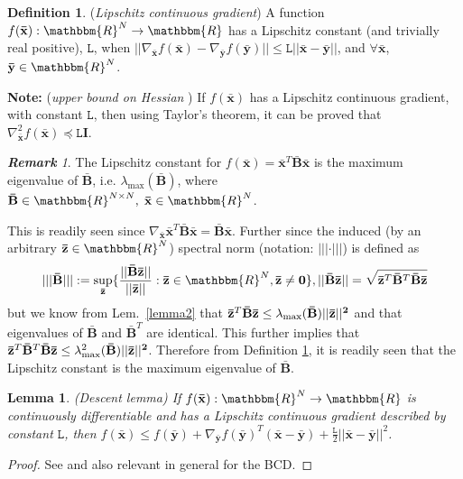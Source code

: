 \documentclass[11pt,draftclsnofoot,onecolumn]{IEEEtran}
\newtheorem{lem}{\bf {Lemma}}
\theoremstyle{definition}
\newtheorem{defn}{\bf Definition}
\theoremstyle{remark}
\newtheorem{remk}{\bf Remark}
\begin{document}
 \begin{defn}\label{mydef2}
({\it Lipschitz continuous gradient}) A function $f(\mathbf{\bar{x}}) :\mathbbm{R}^N\rightarrow\mathbbm{R}$ has a Lipschitz constant (and trivially real positive), $\mathtt{L}$, when $||\nabla_{\mathbf{\bar{x}}}f(\mathbf{\bar{x}})-\nabla_{\mathbf{\bar{y}}}f(\mathbf{\bar{y}})|| \leq\mathtt{L} || \mathbf{\bar{x}-\bar{y}}||$, and $\forall \mathbf{\bar{x}}$, $\mathbf{\bar{y}}\in \mathbbm{R}^N$.
\end{defn}
{\bf Note:} ({\it upper bound on Hessian} ) If $f(\mathbf{\bar{x}})$ has a Lipschitz continuous gradient, with constant $\mathtt{L}$, then  using Taylor's theorem, it can be proved that $\nabla_{\mathbf{\bar{x}}}^2 f(\mathbf{\bar{x}})\preceq \mathtt{L}\mathbf{I}$.
\begin{remk} \label{remark3}
The Lipschitz constant for $f(\mathbf{\bar{x}})=\mathbf{\bar{x}}^T\mathbf{\bar{B}}\mathbf{\bar{x}}$ is the maximum eigenvalue of $\mathbf{\bar{B}}$, i.e. $\lambda_{\max}(\mathbf{\bar{B}})$, where $\mathbf{\bar{B}}\in\mathbbm{R}^{N\times N}, \; \mathbf{\bar{x}}\in\mathbbm{R}^N$.
\end{remk}
This is readily seen since $\nabla_{\mathbf{\bar{x}}}\mathbf{\bar{x}}^T\mathbf{\bar{B}\bar{x}}=\mathbf{\bar{B}\bar{x}}$. Further since the induced (by  an arbitrary $\mathbf{\bar{z}} \in \mathbbm{R}^N$) spectral norm (notation: $||| \cdot |||$) is defined  as
\begin{align*} 
|||\mathbf{\bar{B}}|||:=\sup\limits_{\mathbf{\bar{z}}} \{ \frac{||\bf \bar{B}\bar{z}||}{||\bf \bar{z}||} : \mathbf{\bar{z}}\in\mathbbm{R}^N,\mathbf{\bar{z}}\neq\mathbf{0} \},||{\bf \bar{B}\bar{z}}||=\sqrt{ \mathbf{\bar{z}}^T\mathbf{\bar{B}}^T\mathbf{\bar{B}\bar{z}}}
\end{align*}
but we know from Lem.~\ref{lemma2} that $\mathbf{\bar{z}}^T\mathbf{\bar{B}\bar{z}}\leq \lambda_{\max}( \mathbf{\bar{B}})|| \bf \bar{z}||^2$ and that eigenvalues of $\mathbf{\bar{B}}$ and $\mathbf{\bar{B}}^T$ are identical. This further implies that $\mathbf{\bar{z}}^T\mathbf{\bar{B}}^T\mathbf{\bar{B}\bar{z}}\leq \lambda_{\max}^2( \mathbf{\bar{B}})|| \bf \bar{z}||^2$. Therefore from Definition \ref{mydef2}, it is readily seen that the Lipschitz constant is the maximum eigenvalue of $\mathbf{\bar{B}}$. 
\begin{lem}\label{lemma5}
({\it Descent lemma}) If $f(\mathbf{\bar{x}}) :\mathbbm{R}^N\rightarrow\mathbbm{R}$ is continuously differentiable and has a Lipschitz continuous gradient described by constant $\mathtt{L}$, then $f(\mathbf{\bar{x}})\leq f(\mathbf{\bar{y}})+\nabla_{\mathbf{\bar{y}}}f(\mathbf{\bar{y}})^T(\mathbf{\bar{x}}-\mathbf{\bar{y}}) +\frac{\mathtt{L}}{2}||\mathbf{\bar{x}}-\mathbf{\bar{y}}||^2$.
\end{lem}
\begin{proof}
See \cite[Prop.~A.24]{Bertsekas1999} and also \cite[Lem2.2]{Beck2013} relevant in general for the BCD.
\end{proof}
\end{document}
